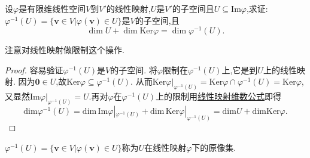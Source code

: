 \documentclass[lang=cn,newtx,10pt,scheme=chinese]{elegantbook}
\begin{document}
\begin{example}
设\(\varphi\)是有限维线性空间\(V\)到\(V'\)的线性映射,\(U\)是\(V'\)的子空间且\(U\subseteq\text{Im}\varphi\),求证:\(\varphi^{-1}(U)=\{\boldsymbol{v}\in V|\varphi(\boldsymbol{v})\in U\}\)是\(V\)的子空间,且
\[
\dim U+\dim\text{Ker}\varphi=\dim\varphi^{-1}(U).
\]
\end{example}
\begin{note}
    注意对线性映射做限制这个操作.
\end{note}
\begin{proof}
    容易验证\(\varphi^{-1}(U)\)是\(V\)的子空间. 将\(\varphi\)限制在\(\varphi^{-1}(U)\)上,它是到\(U\)上的线性映射. 因为\(\boldsymbol{0}\in U\),故\(\text{Ker}\varphi\subseteq\varphi^{-1}(U)\). 从而$\text{Ker}\varphi |_{\varphi ^{-1}\left( U \right)}=\mathrm{Ker}\varphi \cap \varphi ^{-1}\left( U \right) =\mathrm{Ker}\varphi $,又显然$\text{Im}\varphi |_{\varphi ^{-1}\left( U \right)}=U$.再对\(\varphi\)在\(\varphi^{-1}(U)\)上的限制用\hyperref[proposition:值域和核空间维数之和等于原像空间维数]{线性映射维数公式}即得
    \[
        \mathrm{dim}\varphi ^{-1}\left( U \right) =\mathrm{dim}\,\mathrm{Im}\varphi |_{\varphi ^{-1}\left( U \right)}+\mathrm{dim}\,\mathrm{Ker}\varphi |_{\varphi ^{-1}\left( U \right)}=\mathrm{dim}U+\mathrm{dimKer}\varphi .
    \]
\end{proof}
\begin{remark}
    \(\varphi^{-1}(U)=\{\boldsymbol{v}\in V|\varphi(\boldsymbol{v})\in U\}\)称为$U$在线性映射$\varphi$下的原像集.
\end{remark}
\end{document}
